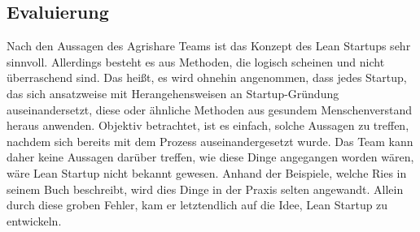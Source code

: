 \subsection*{Evaluierung}
Nach den Aussagen des Agrishare Teams ist das Konzept des Lean Startups sehr sinnvoll. Allerdings besteht es aus Methoden, die logisch scheinen und nicht überraschend sind. Das heißt, es wird ohnehin angenommen, dass jedes Startup, das sich ansatzweise mit Herangehensweisen an Startup-Gründung auseinandersetzt, diese oder ähnliche Methoden aus gesundem Menschenverstand heraus anwenden. Objektiv betrachtet, ist es einfach, solche Aussagen zu treffen, nachdem sich bereits mit dem Prozess auseinandergesetzt wurde. Das Team kann daher keine Aussagen darüber treffen, wie diese Dinge angegangen worden wären, wäre Lean Startup nicht bekannt gewesen. Anhand der Beispiele, welche Ries in seinem Buch beschreibt, wird dies Dinge in der Praxis selten angewandt. Allein durch diese groben Fehler, kam er letztendlich auf die Idee, Lean Startup zu entwickeln.


